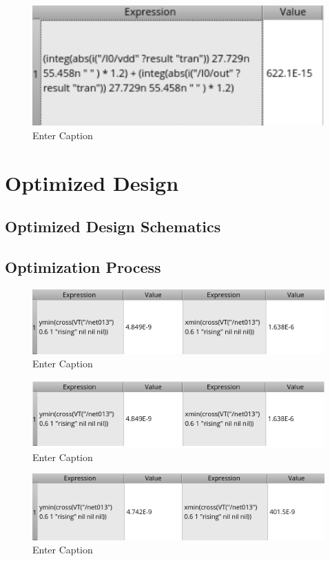 \documentclass[12pt]{article}
\begin{document}
\begin{figure}[H]
    \centering
    \includegraphics[width=0.5\linewidth]{writeup//figures/baseline_energy_val.png}
    \caption{Enter Caption}
\end{figure}

\newpage

\section{Optimized Design}
\subsection{Optimized Design Schematics}



\newpage

\subsection{Optimization Process}

\begin{figure}[H]
    \centering
    \includegraphics[width=0.5\linewidth]{writeup//figures/optimized_wmux_value.png}
    \caption{Enter Caption}
\end{figure}

\begin{figure}[H]
    \centering
    \includegraphics[width=0.5\linewidth]{writeup//figures/wmux1.png}
    \caption{Enter Caption}
\end{figure}

\begin{figure}[H]
    \centering
    \includegraphics[width=0.5\linewidth]{writeup//figures/optimized_wbuf_value.png}
    \caption{Enter Caption}
\end{figure}
\end{document}
